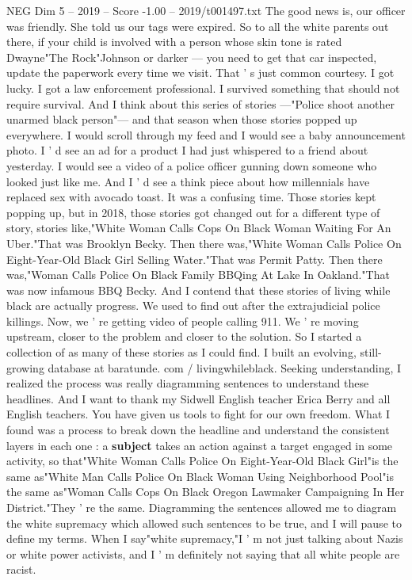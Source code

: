 \begin{textsample}{NEG Dim 5 – 2019 – Score -1.00 – 2019/t001497.txt}
The good news is, our officer was friendly.
She told us our tags were expired.
So to all the white parents out there, if your child is involved with a person whose skin tone is rated Dwayne"The Rock"Johnson or darker — you need to get that car inspected, update the paperwork every time we visit.
That ' s just common courtesy.
I got lucky.
I got a law enforcement professional.
I survived something that should not require survival.
And I think about this series of stories —"Police shoot another unarmed black person"— and that season when those stories popped up everywhere.
I would scroll through my feed and I would see a baby announcement photo.
I ' d see an ad for a product I had just whispered to a friend about yesterday.
I would see a video of a police officer gunning down someone who looked just like me.
And I ' d see a think piece about how millennials have replaced sex with avocado toast.
It was a confusing time.
Those stories kept popping up, but in 2018, those stories got changed out for a different type of story, stories like,"White Woman Calls Cops On Black Woman Waiting For An Uber."That was Brooklyn Becky.
Then there was,"White Woman Calls Police On Eight-Year-Old Black Girl Selling Water."That was Permit Patty.
Then there was,"Woman Calls Police On Black Family BBQing At Lake In Oakland."That was now infamous BBQ Becky.
And I contend that these stories of living while black are actually progress.
We used to find out after the extrajudicial police killings.
Now, we ' re getting video of people calling 911.
We ' re moving upstream, closer to the problem and closer to the solution.
So I started a collection of as many of these stories as I could find.
I built an evolving, still-growing database at baratunde. com / livingwhileblack.
Seeking understanding, I realized the process was really diagramming sentences to understand these headlines.
And I want to thank my Sidwell English teacher Erica Berry and all English teachers.
You have given us tools to fight for our own freedom.
What I found was a process to break down the headline and understand the consistent layers in each one : a \textbf{subject} takes an action against a target engaged in some activity, so that"White Woman Calls Police On Eight-Year-Old Black Girl"is the same as"White Man Calls Police On Black Woman Using Neighborhood Pool"is the same as"Woman Calls Cops On Black Oregon Lawmaker Campaigning In Her District."They ' re the same.
Diagramming the sentences allowed me to diagram the white supremacy which allowed such sentences to be true, and I will pause to define my terms.
When I say"white supremacy,"I ' m not just talking about Nazis or white power activists, and I ' m definitely not saying that all white people are racist.

\end{textsample}
